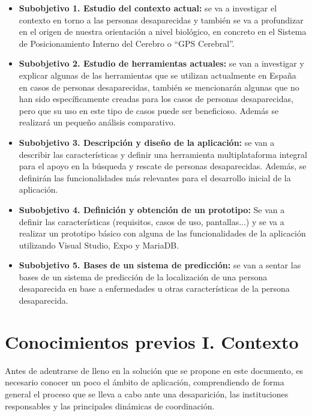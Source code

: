     \begin{itemize}
        \item \textbf{Subobjetivo 1. Estudio del contexto actual:} se va a investigar el contexto en torno a las personas desaparecidas y también se va a profundizar en el origen de nuestra orientación a nivel biológico, en concreto en el Sistema de Posicionamiento Interno del Cerebro o ``GPS Cerebral''.
        
        \item \textbf{Subobjetivo 2. Estudio de herramientas actuales:} se van a investigar y explicar algunas de las herramientas que se utilizan actualmente en España en casos de personas desaparecidas, también se mencionarán algunas que no han sido específicamente creadas para los casos de personas desaparecidas, pero que su uso en este tipo de casos puede ser beneficioso. Además se realizará un pequeño análisis comparativo.
        
        \item \textbf{Subobjetivo 3. Descripción y diseño de la aplicación:} se van a describir las características y definir una herramienta multiplataforma integral para el apoyo en la búsqueda y rescate de personas desaparecidas. Además, se definirán las funcionalidades más relevantes para el desarrollo inicial de la aplicación.
        
        \item \textbf{Subobjetivo 4. Definición y obtención de un prototipo:} Se van a definir las características (requisitos, casos de uso, pantallas...) y se va a realizar un prototipo básico con alguna de las funcionalidades de la aplicación utilizando Visual Studio, Expo y MariaDB.

        \item \textbf{Subobjetivo 5. Bases de un sistema de predicción:} se van a sentar las bases de un sistema de predicción de la localización de una persona desaparecida en base a enfermedades u otras características de la persona desaparecida.
        

    \end{itemize}
    
    \section{Conocimientos previos I. Contexto}\label{contexto}
    
Antes de adentrarse de lleno en la solución que se propone en este documento, es necesario conocer un poco el ámbito de aplicación, comprendiendo de forma general el proceso que se lleva a cabo ante una desaparición, las instituciones responsables y las principales dinámicas de coordinación. 

